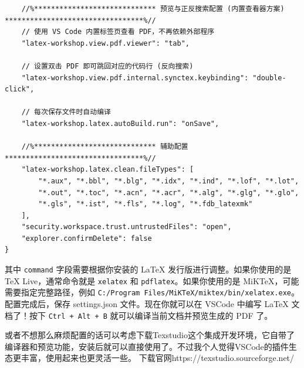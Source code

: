 \begin{lstlisting}
    //%***************************** 预览与正反搜索配置 (内置查看器方案) *********************************%//
    // 使用 VS Code 内置标签页查看 PDF，不再依赖外部程序
    "latex-workshop.view.pdf.viewer": "tab",

    // 设置双击 PDF 即可跳回对应的代码行 (反向搜索)
    "latex-workshop.view.pdf.internal.synctex.keybinding": "double-click",

    // 每次保存文件时自动编译
    "latex-workshop.latex.autoBuild.run": "onSave",

    //%***************************** 辅助配置 *********************************%//
    "latex-workshop.latex.clean.fileTypes": [
        "*.aux", "*.bbl", "*.blg", "*.idx", "*.ind", "*.lof", "*.lot", 
        "*.out", "*.toc", "*.acn", "*.acr", "*.alg", "*.glg", "*.glo", 
        "*.gls", "*.ist", "*.fls", "*.log", "*.fdb_latexmk"
    ],
    "security.workspace.trust.untrustedFiles": "open",
    "explorer.confirmDelete": false
}
\end{lstlisting}
其中 \texttt{command} 字段需要根据你安装的 \LaTeX{} 发行版进行调整。如果你使用的是 TeX Live，通常命令就是 \texttt{xelatex} 和 \texttt{pdflatex}。如果你使用的是 MiKTeX，可能需要指定完整路径，例如 \texttt{C:/Program Files/MiKTeX/miktex/bin/xelatex.exe}。
配置完成后，保存 settings.json 文件。现在你就可以在 VSCode 中编写 \LaTeX{} 文档了！按下 \texttt{Ctrl + Alt + B} 就可以编译当前文档并预览生成的 PDF 了。

或者不想那么麻烦配置的话可以考虑下载Texstudio这个集成开发环境，它自带了编译器和预览功能，安装后就可以直接使用了。不过我个人觉得VSCode的插件生态更丰富，使用起来也更灵活一些。
下载官网https://texstudio.sourceforge.net/